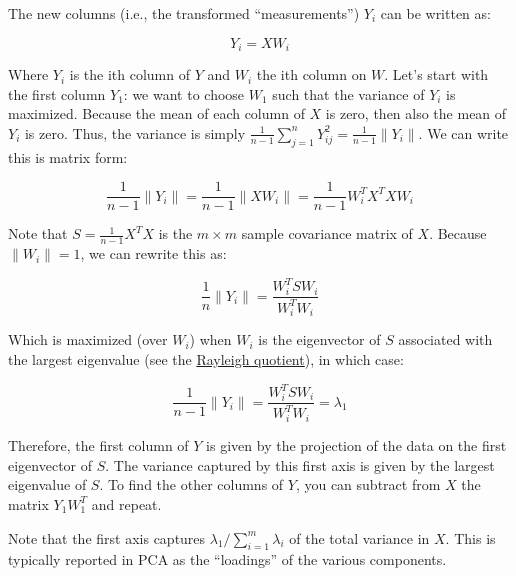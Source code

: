 \documentclass[
  letterpaper,
  DIV=11,
  numbers=noendperiod]{scrreprt}
\newenvironment{Shaded}{\begin{snugshade}}{\end{snugshade}}
\newcommand{\AttributeTok}[1]{\textcolor[rgb]{0.40,0.45,0.13}{#1}}
\newcommand{\CommentTok}[1]{\textcolor[rgb]{0.37,0.37,0.37}{#1}}
\newcommand{\ConstantTok}[1]{\textcolor[rgb]{0.56,0.35,0.01}{#1}}
\newcommand{\DecValTok}[1]{\textcolor[rgb]{0.68,0.00,0.00}{#1}}
\newcommand{\FunctionTok}[1]{\textcolor[rgb]{0.28,0.35,0.67}{#1}}
\newcommand{\NormalTok}[1]{\textcolor[rgb]{0.00,0.23,0.31}{#1}}
\newcommand{\OtherTok}[1]{\textcolor[rgb]{0.00,0.23,0.31}{#1}}
\newcommand{\SpecialCharTok}[1]{\textcolor[rgb]{0.37,0.37,0.37}{#1}}
\begin{document}
The new columns (i.e., the transformed ``measurements'') \(Y_i\) can be
written as:

\[
Y_{i} = X W_i
\]

Where \(Y_i\) is the ith column of \(Y\) and \(W_i\) the ith column on
\(W\). Let's start with the first column \(Y_1\): we want to choose
\(W_1\) such that the variance of \(Y_i\) is maximized. Because the mean
of each column of \(X\) is zero, then also the mean of \(Y_i\) is zero.
Thus, the variance is simply
\(\frac{1}{n-1}\sum_{j =1}^{n} Y_{ij}^2 =\frac{1}{n-1} \|Y_i\|\). We can
write this is matrix form:

\[\frac{1}{n-1}\|Y_i\| = \frac{1}{n-1}\|XW_i \| = \frac{1}{n-1} W_i^TX^T X W_i\]

Note that \(S = \frac{1}{n-1} X^T X\) is the \(m \times m\) sample
covariance matrix of \(X\). Because \(\|W_i\| = 1\), we can rewrite this
as:

\[
\frac{1}{n}\|Y_i\| = \frac{W_i^T S W_i}{W_i^T W_i}
\]

Which is maximized (over \(W_i\)) when \(W_i\) is the eigenvector of
\(S\) associated with the largest eigenvalue (see the
\href{https://en.wikipedia.org/wiki/Rayleigh_quotient}{Rayleigh
quotient}), in which case:

\[
\frac{1}{n-1}\|Y_i\| = \frac{W_i^T S W_i}{W_i^T W_i} = \lambda_1
\]

Therefore, the first column of \(Y\) is given by the projection of the
data on the first eigenvector of \(S\). The variance captured by this
first axis is given by the largest eigenvalue of \(S\). To find the
other columns of \(Y\), you can subtract from \(X\) the matrix
\(Y_1 W_1^T\) and repeat.

Note that the first axis captures
\(\lambda_1 / \sum_{i = 1}^m \lambda_i\) of the total variance in \(X\).
This is typically reported in PCA as the ``loadings'' of the various
components.

\begin{Shaded}
\end{Shaded}
\end{document}
